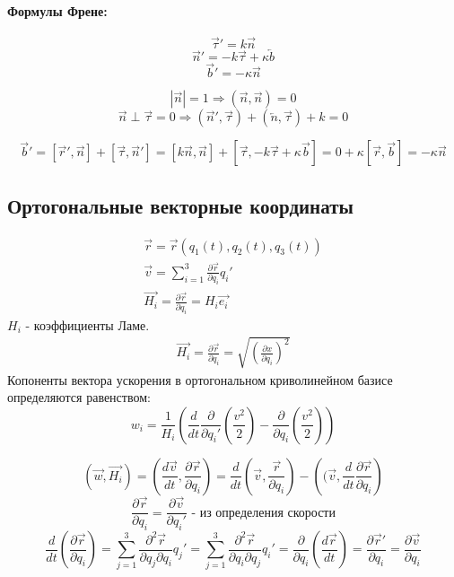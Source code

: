 \documentclass{article}
\begin{document}
  \paragraph{Формулы Френе:}
  $$ \overrightarrow{\tau}' = k \overrightarrow{n} $$
  $$ \overrightarrow{n}' = - k\overrightarrow{\tau} + \kappa \overleftarrow{b} $$
  $$ \overrightarrow{b}' = -\kappa\overrightarrow{n} $$
  
  $$ | \overrightarrow{n} | = 1 \Rightarrow (\overrightarrow{n}, \overrightarrow{n}) = 0 $$
  $$ \overrightarrow{n} \perp \overrightarrow{\tau} = 0 \Rightarrow (\overrightarrow{n}', \overrightarrow{\tau}) + (\overleftarrow{n}, \overrightarrow{\tau}) + k = 0 $$
  
  $$ \overrightarrow{b}' = [\overrightarrow{r}', \overrightarrow{n}] + [\overrightarrow{\tau}, \overrightarrow{n}'] = [k\overrightarrow{n}, \overrightarrow{n}] + [\overrightarrow{\tau}, -k\overrightarrow{\tau} + \kappa \overrightarrow{b}] = 0 + \kappa[\overrightarrow{r}, \overrightarrow{b}] = -\kappa\overrightarrow{n} $$
  
  \subsection*{Ортогональные векторные координаты}
  
  \begin{gather}
  \overrightarrow{r} = \overrightarrow{r}(q_1(t), q_2(t), q_3(t)) \\
  \overrightarrow{v} = \sum \limits_{i = 1}^3 \frac{\partial\overrightarrow{r}}{\partial q_i} q_i'\\
  \overrightarrow{H_i} = \frac{\partial\overrightarrow{r}}{\partial q_i} = H_i \overrightarrow{e_i} 
  \end{gather}
  $H_i$ - коэффициенты Ламе.
  \begin{gather}
  \overrightarrow{H_i} = \frac{\partial \overrightarrow{r}}{\partial q_i} = \sqrt{\left(\frac{\partial x}{\partial q_i}\right) ^2}
  \end{gather}
  Копоненты вектора ускорения в ортогональном криволинейном базисе определяются равенством:
  $$ w_i = \frac{1}{H_i}\left(\frac{d}{dt} \frac{\partial}{\partial q_i'} \left(\frac{v^2}{2}\right) - \frac{\partial}{\partial q_i} \left(\frac{v^2}{2} \right) \right) $$
  
$$ (\overrightarrow{w}, \overrightarrow{H_i}) = \left(\frac{d\overrightarrow{v}}{dt}, \frac{\partial \overrightarrow{r}}{\partial q_i} \right) = \frac{d}{dt} \left(\overrightarrow{v}, \frac{\overrightarrow{r}}{\partial q_i}\right) - \left((\overrightarrow{v}, \frac{d}{dt} \frac{\partial \overrightarrow{r}}{\partial q_i} \right) $$
$$ \frac{\partial \overrightarrow{r}}{\partial q_i} = \frac{\partial \overrightarrow{v}}{\partial q_i'} \text{ - из определения скорости} $$  
$$ \frac{d}{dt} \left(\frac{\partial \overrightarrow{r}}{\partial q_i} \right) = \sum \limits_{j = 1}^3 \frac{\partial^2 \overrightarrow{r}}{\partial q_j \partial q_i} q_j' = \sum \limits_{j = 1}^3 \frac{\partial^2 \overrightarrow{r}}{\partial q_i \partial q_j} q_i' = \frac{\partial}{\partial q_i} \left( \frac{d\overrightarrow{r}}{dt} \right) = \frac{\partial \overrightarrow{r}'}{\partial q_i} = \frac{\partial \overrightarrow{v}}{\partial q_i} $$
\end{document}
